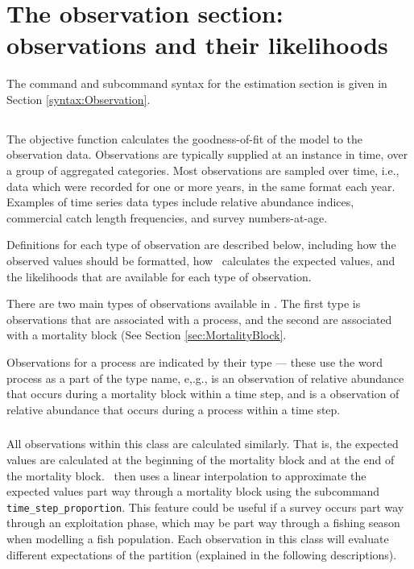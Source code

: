 \section{The observation section: observations and their likelihoods\label{sec:Observation}}

The command and subcommand syntax for the estimation section is given in Section \ref{syntax:Observation}.

\subsection{}

The objective function calculates the goodness-of-fit of the model to the observation data. Observations are typically supplied at an instance in time, over a group of aggregated categories. Most observations are sampled over time, i.e., data which were recorded for one or more years, in the same format each year. Examples of time series data types include relative abundance indices, commercial catch length frequencies, and survey numbers-at-age.

Definitions for each type of observation are described below, including how the observed values should be formatted, how \CNAME\ calculates the expected values, and the likelihoods that are available for each type of observation.

There are two main types of observations available in \CNAME. The first type is observations that are associated with a process, and the second are associated with a mortality block (See Section \ref{sec:MortalityBlock}.

Observations for a process are indicated by their type --- these use the word process as a part of the type name, e,.g.,  is an observation of relative abundance that occurs during a mortality block within a time step, and  is a observation  of relative abundance that occurs during a process within a time step.

\subsubsection{}

All observations within this class are calculated similarly. That is, the expected values are calculated at the beginning of the mortality block and at the end of the mortality block. \CNAME\ then uses a linear interpolation to approximate the expected values part way through a mortality block using the subcommand \texttt{time\_step\_proportion}. This feature could be useful if a survey occurs part way through an exploitation phase, which may be part way through a fishing season when modelling a fish population. Each observation in this class will evaluate different expectations of the partition (explained in the following descriptions).

